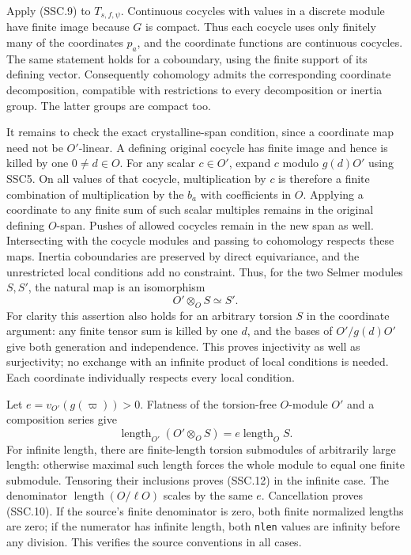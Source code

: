 Apply (SSC.9) to $T_{s,f,\psi}$. Continuous cocycles with values
in a discrete module have finite image because $G$ is compact.
Thus each cocycle uses only finitely many of the coordinates $p_a$,
and the coordinate functions are continuous cocycles. The same
statement holds for a coboundary, using the finite support of its
defining vector. Consequently cohomology admits the corresponding
coordinate decomposition, compatible with restrictions to every
decomposition or inertia group. The latter groups are compact too.

It remains to check the exact crystalline-span condition, since a
coordinate map need not be $O'$-linear. A defining original cocycle
has finite image and hence is killed by one $0\ne d\in O$.
For any scalar $c\in O'$, expand $c$ modulo $g(d)O'$ using SSC5.
On all values of that cocycle, multiplication by $c$ is therefore
a finite combination of multiplication by the $b_a$ with
coefficients in $O$. Applying a coordinate to any finite sum
of such scalar multiples remains in the original defining
$O$-span. Pushes of allowed cocycles remain in the new span as
well. Intersecting with the cocycle modules and passing to
cohomology respects these maps. Inertia coboundaries are preserved
by direct equivariance, and the unrestricted local conditions add
no constraint. Thus, for the two Selmer modules $S,S'$, the natural
map is an isomorphism
\[
                     O'\otimes_O S\simeq S'.                 \tag{SSC.11}
\]
For clarity this assertion also holds for an arbitrary torsion
$S$ in the coordinate argument: any finite tensor sum is killed
by one $d$, and the bases of $O'/g(d)O'$ give both generation and
independence. This proves injectivity as well as surjectivity;
no exchange with an infinite product of local conditions is needed.
Each coordinate individually respects every local condition.

Let $e=v_{O'}(g(\varpi))>0$. Flatness of the torsion-free
$O$-module $O'$ and a composition series give
\[
 \operatorname{length}_{O'}(O'\otimes_O S)
          =e\operatorname{length}_O S.                        \tag{SSC.12}
\]
For infinite length, there are finite-length torsion submodules of
arbitrarily large length: otherwise maximal such length forces
the whole module to equal one finite submodule. Tensoring their
inclusions proves (SSC.12) in the infinite case. The denominator
$\operatorname{length}(O/\ell O)$ scales by the same $e$.
Cancellation proves (SSC.10). If the source's finite denominator
is zero, both finite normalized lengths are zero; if the numerator
has infinite length, both \texttt{nlen} values are infinity before
any division. This verifies the source conventions in all cases.

